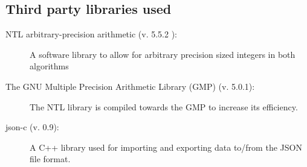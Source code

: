 \subsection{Third party libraries used}
\begin{description}
\item[NTL arbitrary-precision arithmetic (v. 5.5.2 ):] A software library to allow for arbitrary precision sized integers in both algorithms
\item[The GNU Multiple Precision Arithmetic Library (GMP) (v. 5.0.1):] The NTL library is compiled towards the GMP to increase its efficiency. 
\item[json-c (v. 0.9):] A C++ library used for importing and exporting data to/from the JSON file format.
\end{description}
